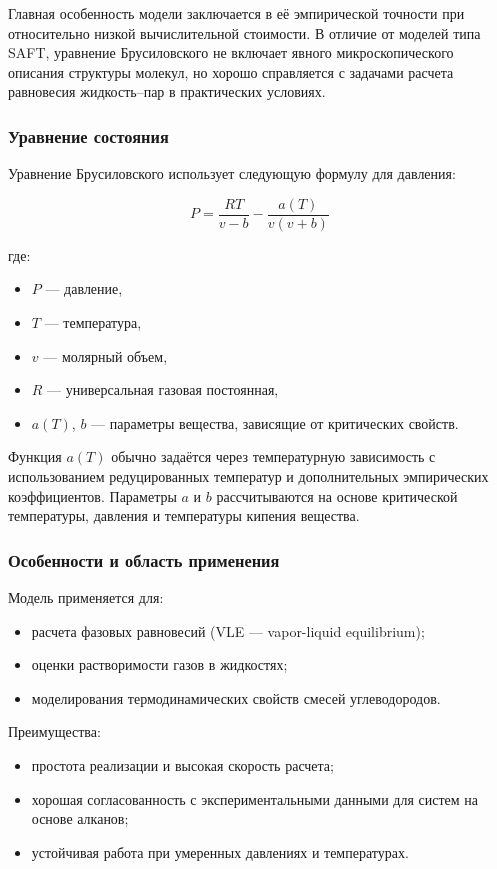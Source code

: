 \documentclass[a4paper,12pt]{article}
\begin{document}
Главная особенность модели заключается в её эмпирической точности при относительно низкой вычислительной стоимости. В отличие от моделей типа SAFT, уравнение Брусиловского не включает явного микроскопического описания структуры молекул, но хорошо справляется с задачами расчета равновесия жидкость–пар в практических условиях.

\subsubsection{Уравнение состояния}

Уравнение Брусиловского использует следующую формулу для давления:

\begin{equation}
P = \frac{RT}{v - b} - \frac{a(T)}{v(v + b)}
\end{equation}

где:
\begin{itemize}
    \item \( P \) — давление,
    \item \( T \) — температура,
    \item \( v \) — молярный объем,
    \item \( R \) — универсальная газовая постоянная,
    \item \( a(T) \), \( b \) — параметры вещества, зависящие от критических свойств.
\end{itemize}

Функция \( a(T) \) обычно задаётся через температурную зависимость с использованием редуцированных температур и дополнительных эмпирических коэффициентов. Параметры \( a \) и \( b \) рассчитываются на основе критической температуры, давления и температуры кипения вещества.

\subsubsection{Особенности и область применения}

Модель применяется для:
\begin{itemize}
    \item расчета фазовых равновесий (VLE — vapor-liquid equilibrium);
    \item оценки растворимости газов в жидкостях;
    \item моделирования термодинамических свойств смесей углеводородов.
\end{itemize}

Преимущества:
\begin{itemize}
    \item простота реализации и высокая скорость расчета;
    \item хорошая согласованность с экспериментальными данными для систем на основе алканов;
    \item устойчивая работа при умеренных давлениях и температурах.
\end{itemize}
\end{document}
